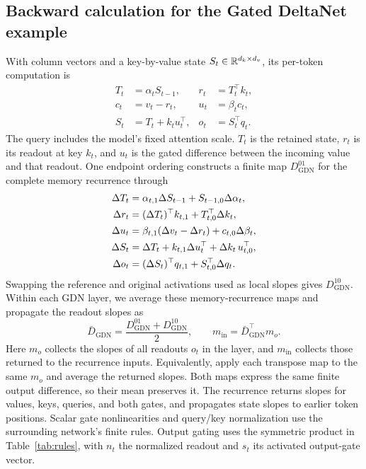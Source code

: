\subsection{Backward calculation for the Gated DeltaNet example}
\label{app:memory}
With column vectors and a key-by-value state $S_t\in\mathbb{R}^{d_k\times d_v}$, its per-token computation is
\begin{align}
T_t&=\alpha_t S_{t-1}, & r_t&=T_t^\top k_t, \nonumber\\
c_t&=v_t-r_t, & u_t&=\beta_t c_t, \label{eq:gdn}\\
S_t&=T_t+k_tu_t^\top, & o_t&=S_t^\top q_t. \nonumber
\end{align}
The query includes the model's fixed attention scale. $T_t$ is the retained state, $r_t$ is its readout at key $k_t$, and $u_t$ is the gated difference between the incoming value and that readout. One endpoint ordering constructs a finite map $D_{\mathrm{GDN}}^{01}$ for the complete memory recurrence through
\begin{align}
\Delta T_t&=\alpha_{t,1}\Delta S_{t-1}+S_{t-1,0}\Delta\alpha_t, \nonumber\\
\Delta r_t&=(\Delta T_t)^\top k_{t,1}+T_{t,0}^\top\Delta k_t, \nonumber\\
\Delta u_t&=\beta_{t,1}(\Delta v_t-\Delta r_t)+c_{t,0}\Delta\beta_t, \label{eq:gdn-finite}\\
\Delta S_t&=\Delta T_t+k_{t,1}\Delta u_t^\top+\Delta k_t\,u_{t,0}^\top, \nonumber\\
\Delta o_t&=(\Delta S_t)^\top q_{t,1}+S_{t,0}^\top\Delta q_t. \nonumber
\end{align}
Swapping the reference and original activations used as local slopes gives $D_{\mathrm{GDN}}^{10}$. Within each GDN layer, we average these memory-recurrence maps and propagate the readout slopes as
\begin{equation}
\bar D_{\mathrm{GDN}}=\frac{D_{\mathrm{GDN}}^{01}+D_{\mathrm{GDN}}^{10}}{2},
\qquad m_{\mathrm{in}}=\bar D_{\mathrm{GDN}}^\top m_o.
\label{eq:gdn-symmetric}
\end{equation}
Here $m_o$ collects the slopes of all readouts $o_t$ in the layer, and $m_{\mathrm{in}}$ collects those returned to the recurrence inputs. Equivalently, apply each transpose map to the same $m_o$ and average the returned slopes. Both maps express the same finite output difference, so their mean preserves it. The recurrence returns slopes for values, keys, queries, and both gates, and propagates state slopes to earlier token positions. Scalar gate nonlinearities and query/key normalization use the surrounding network's finite rules. Output gating uses the symmetric product in Table~\ref{tab:rules}, with $n_t$ the normalized readout and $s_t$ its activated output-gate vector.

